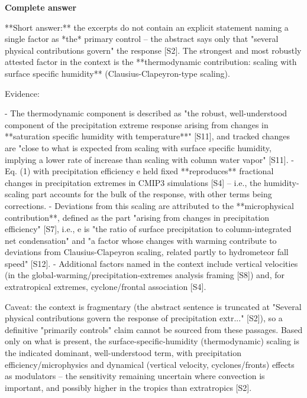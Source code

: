 \documentclass[10pt]{article}
\begin{document}
\textbf{Complete answer}
\begin{AnswerText}
**Short answer:** the excerpts do not contain an explicit statement naming a single factor as *the* primary control -- the abstract says only that "several physical contributions govern" the response [S2]. The strongest and most robustly attested factor in the context is the **thermodynamic contribution: scaling with surface specific humidity** (Clausius-Clapeyron-type scaling).

Evidence:

- The thermodynamic component is described as "the robust, well-understood component of the precipitation extreme response arising from changes in **saturation specific humidity with temperature**" [S11], and tracked changes are "close to what is expected from scaling with surface specific humidity, implying a lower rate of increase than scaling with column water vapor" [S11].
- Eq. (1) with precipitation efficiency e held fixed **reproduces** fractional changes in precipitation extremes in CMIP3 simulations [S4] -- i.e., the humidity-scaling part accounts for the bulk of the response, with other terms being corrections.
- Deviations from this scaling are attributed to the **microphysical contribution**, defined as the part "arising from changes in precipitation efficiency" [S7], i.e., e is "the ratio of surface precipitation to column-integrated net condensation" and "a factor whose changes with warming contribute to deviations from Clausius-Clapeyron scaling, related partly to hydrometeor fall speed" [S12].
- Additional factors named in the context include vertical velocities (in the global-warming/precipitation-extremes analysis framing [S8]) and, for extratropical extremes, cyclone/frontal association [S4].

Caveat: the context is fragmentary (the abstract sentence is truncated at "Several physical contributions govern the response of precipitation extr..." [S2]), so a definitive "primarily controls" claim cannot be sourced from these passages. Based only on what is present, the surface-specific-humidity (thermodynamic) scaling is the indicated dominant, well-understood term, with precipitation efficiency/microphysics and dynamical (vertical velocity, cyclones/fronts) effects as modulators -- the sensitivity remaining uncertain where convection is important, and possibly higher in the tropics than extratropics [S2].
\end{AnswerText}
\end{document}
